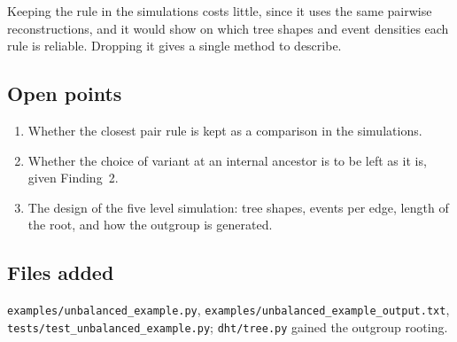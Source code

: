 \documentclass[11pt,a4paper]{article}
\begin{document}
Keeping the rule in the simulations costs little, since it uses the same pairwise
reconstructions, and it would show on which tree shapes and event densities each rule is
reliable. Dropping it gives a single method to describe.

\subsection{Open points}
\begin{enumerate}
\item Whether the closest pair rule is kept as a comparison in the simulations.
\item Whether the choice of variant at an internal ancestor is to be left as it is, given
  Finding~2.
\item The design of the five level simulation: tree shapes, events per edge, length of the root,
  and how the outgroup is generated.
\end{enumerate}

\subsection{Files added}
\texttt{examples/unbalanced\_example.py}, \texttt{examples/unbalanced\_example\_output.txt},
\texttt{tests/test\_unbalanced\_example.py}; \texttt{dht/tree.py} gained the outgroup rooting.
\end{document}
